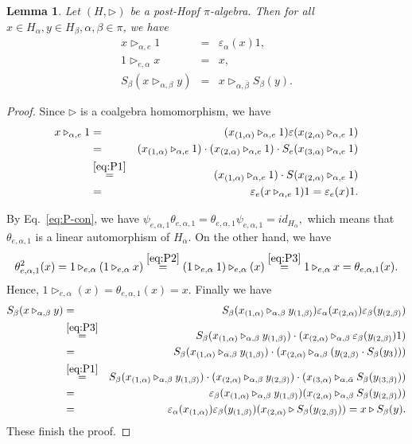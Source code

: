 \documentclass[11pt]{article}
\def\a{\alpha}
\def\b{\beta}
\def\tr{\triangleright}
\def\v{\varepsilon}
\newtheorem{lemma}[theorem]{Lemma}
\begin{document}
\begin{lemma}
Let $(H,\tr)$ be a post-Hopf $\pi$-algebra. Then for all $x\in H_\a,y\in H_\b, \a,\b\in\pi$, we have
\begin{eqnarray}
\label{eq:P3} x\tr_{\a,e} 1 &=& \v_\a(x)1, \\
\label{eq:P4} 1\tr_{e,\a} x &=& x, \\
\label{eq:P5} S_\b(x\tr_{\a,\b} y) &=& x\tr_{\a,\bar{\b}} S_\b(y).
\end{eqnarray}
\end{lemma}
\begin{proof}
Since $\tr$ is a coalgebra homomorphism, we have
\begin{eqnarray*}
x\tr_{\a,e} 1 &=& (x_{(1,\a)}\tr_{\a,e} 1) \v(x_{(2,\a)}\tr_{\a,e} 1)\\
 &=& (x_{(1,\a)}\tr_{\a,e} 1)\cdot (x_{(2,\a)}\tr_{\a,e} 1)\cdot S_e(x_{(3,\a)}\tr_{\a,e} 1)\\
 &\stackrel{\ref{eq:P1}}{=}& (x_{(1,\a)}\tr_{\a,e} 1)\cdot S(x_{(2,\a)}\tr_{\a,e} 1)\\
 &=& \v_e(x\tr_{\a,e} 1)1 =\v_e(x)1.
\end{eqnarray*}

By Eq.~\eqref{eq:P-con},  we have
$\psi_{e,\a,1}\theta_{e,\a,1}=\theta_{e,\a,1}\psi_{e,\a,1}=id_{H_\a},$
which means that $\theta_{e,\a,1}$ is a linear automorphism of $H_\a$. On the other hand, we have
\begin{eqnarray*}
\theta_{e,\a,1}^2(x) = 1\tr_{e,\a} (1\tr_{e,\a} x)
\stackrel{\eqref{eq:P2}}{=}  (1\tr_{e,\a} 1)\tr_{e,\a} (x)
\stackrel{\eqref{eq:P3}}{=}  1\tr_{e,\a} x = \theta_{e,\a,1}(x).
\end{eqnarray*}
Hence, $1\tr_{e,\a} (x) = \theta_{e,\a,1}(x) = x$.
Finally we have
\begin{eqnarray*}
S_\b(x\tr_{\a,\b} y)&=&S_\b(x_{(1,\a)}\tr_{\a,\b} y_{(1,\b)})\v_\a(x_{(2,\a)})\v_\b(y_{(2,\b)}) \\
 &\stackrel{\ref{eq:P3}}{=}& S_\b(x_{(1,\a)}\tr_{\a,\b} y_{(1,\b)})\cdot(x_{(2,\a)}\tr_{\a,\b} \v_\b(y_{(2,\b)})1)\\
&=&S_\b(x_{(1,\a)}\tr_{\a,\b} y_{(1,\b)})\cdot(x_{(2,\a)}\tr_{\a,\b} (y_{(2,\b)}\cdot S_\b(y_3))) \\
 &\stackrel{\ref{eq:P1}}{=}& S_\b(x_{(1,\a)}\tr_{\a,\b} y_{(1,\b)})\cdot(x_{(2,\a)}\tr_{\a,\b} y_{(2,\b)})\cdot(x_{(3,\a)}\tr_{\a,\bar{\a}} S_\b(y_{(3,\b)}))\\
&=&\v_\b(x_{(1,\a)}\tr_{\a,\b} y_{(1,\b)})(x_{(2,\a)}\tr_{\a,\b} S_\b(y_{(2,\b)}))\\
&=&\v_\a(x_{(1,\a)})\v_\b(y_{(1,\b)})(x_{(2,\a)}\tr S_\b(y_{(2,\b)}))=x\tr S_\b(y). 
\end{eqnarray*}
These finish the proof.
\end{proof}
\end{document}
